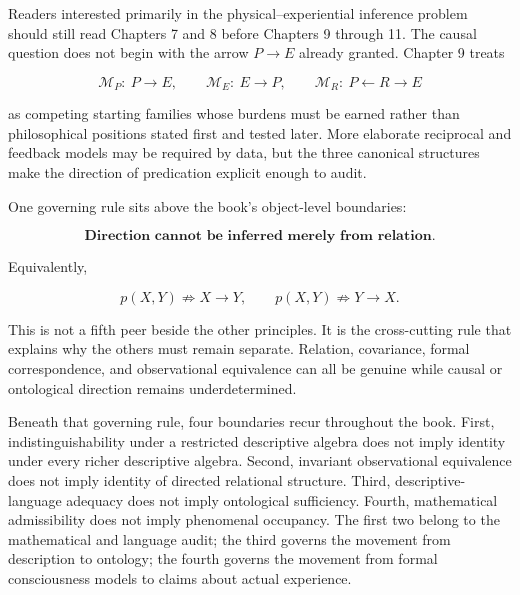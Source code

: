 Readers interested primarily in the physical--experiential inference problem should still read Chapters 7 and 8 before Chapters 9 through 11. The causal question does not begin with the arrow $P\to E$ already granted. Chapter 9 treats

\[
\mathcal M_P:\ P\longrightarrow E,
\qquad
\mathcal M_E:\ E\longrightarrow P,
\qquad
\mathcal M_R:\ P\longleftarrow R\longrightarrow E
\]

as competing starting families whose burdens must be earned rather than philosophical positions stated first and tested later. More elaborate reciprocal and feedback models may be required by data, but the three canonical structures make the direction of predication explicit enough to audit.

One governing rule sits above the book's object-level boundaries:

\[
\boxed{
\textbf{Direction cannot be inferred merely from relation.}
}
\]

Equivalently,

\[
p(X,Y)\nRightarrow X\longrightarrow Y,
\qquad
p(X,Y)\nRightarrow Y\longrightarrow X.
\]

This is not a fifth peer beside the other principles. It is the cross-cutting rule that explains why the others must remain separate. Relation, covariance, formal correspondence, and observational equivalence can all be genuine while causal or ontological direction remains underdetermined.

Beneath that governing rule, four boundaries recur throughout the book. First, indistinguishability under a restricted descriptive algebra does not imply identity under every richer descriptive algebra. Second, invariant observational equivalence does not imply identity of directed relational structure. Third, descriptive-language adequacy does not imply ontological sufficiency. Fourth, mathematical admissibility does not imply phenomenal occupancy. The first two belong to the mathematical and language audit; the third governs the movement from description to ontology; the fourth governs the movement from formal consciousness models to claims about actual experience.

